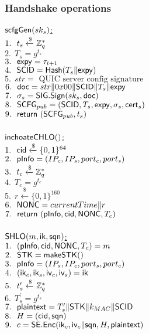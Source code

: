 \subsubsection{Handshake operations}
\underline{$\mathsf{scfgGen}(sk_s)$:} \\
 $1.\ \ t_s \xleftarrow{\$} \mathbb{Z}_{q}^{\ast}$ \\
 $2.\ \ T_s = g^{t_s}$ \\
 $3.\ \ \mathsf{expy} = \tau_{t+1}$ \\
 $4.\ \ \mathsf{SCID} = \mathsf{Hash}(T_s \| \mathsf{expy})$ \\
 $5.\ \ str = \text{ QUIC server config signature }$ \\
 $6.\ \ \mathsf{doc} = str \| 0x00 \| \mathsf{SCID} \| T_s \| \mathsf{expy}$ \\
 $7.\ \ \sigma_s = \mathsf{SIG}.\mathsf{Sign}(sk_s, \mathsf{doc})$ \\
 $8.\ \ \mathsf{SCFG}_{pub} = (\mathsf{SCID}, T_s, \mathsf{expy}, \sigma_s, \mathsf{cert}_s)$ \\
 $9.\ \ \mathsf{return}\ (\mathsf{SCFG}_{pub}, t_s)$ \\
\\
\underline{$\mathsf{inchoateCHLO}()$:} \\
 $1.\ \ \mathsf{cid} \xleftarrow{\$} \{0,1\}^{64} $ \\
 $2.\ \ \mathsf{pInfo} = (IP_c, IP_s, port_c, port_s)$ \\
 $3.\ \ t_c \xleftarrow{\$} \mathbb{Z}_{q}^{\ast}$ \\
 $4.\ \ T_c = g^{t_c}$ \\
 $5.\ \ r \xleftarrow{\$} \{0,1\}^{160}$ \\
 $6.\ \ \mathsf{NONC} = currentTime \| r$ \\
 $7.\ \ \mathsf{return}\ (\mathsf{pInfo}, \mathsf{cid}, \mathsf{NONC}, T_c)$ \\
\\
\underline{$\mathsf{SHLO}(m, \mathsf{ik}, \mathsf{sqn})$:} \\
 $1.\ \ (\mathsf{pInfo}, \mathsf{cid}, \mathsf{NONC}, T_c) = m$ \\
 $2.\ \ \mathsf{STK} = \mathsf{makeSTK}()$ \\
 $3.\ \ \mathsf{pInfo} = (IP_s, IP_c, port_s, port_c)$ \\
 $4.\ \ (\mathsf{ik}_c, \mathsf{ik}_s, \mathsf{iv}_c, \mathsf{iv}_s) = \mathsf{ik}$ \\
 $5.\ \ t_s^{\prime} \xleftarrow{\$} \mathbb{Z}_{q}^{\ast}$ \\
 $6.\ \ T_s^{\prime} = g^{t_s^{\prime}}$ \\
 $7.\ \ \mathsf{plaintext} = T_{s}^{\prime} \| \mathsf{STK} \| k_{MAC} \| \mathsf{SCID}$\\
 $8.\ \ H = (\mathsf{cid}, \mathsf{sqn})$ \\
 $9.\ \ c = \mathsf{SE}.\mathsf{Enc}(\mathsf{ik}_c, \mathsf{iv}_c \| \mathsf{sqn}, H, \mathsf{plaintext})$ \\
